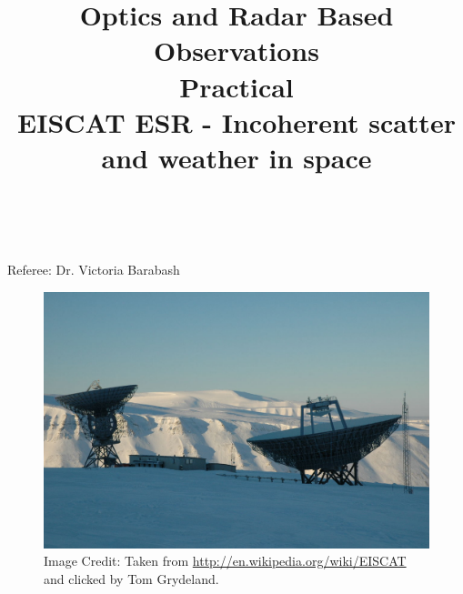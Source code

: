 \documentclass{article}
\title{\textbf {Optics and Radar Based Observations} \\ Practical\\ EISCAT ESR - Incoherent scatter and weather in space} %
\author{\authorivan\\\authoranu}
\begin{document}
\maketitle %

\centerline{Referee: Dr. Victoria Barabash}

\vspace{10mm}

\begin{figure}[h!]
\centering
\includegraphics[width=\textwidth]{Figures/eiscat.jpg}
\caption*{Image Credit: Taken from \url{http://en.wikipedia.org/wiki/EISCAT} and clicked by Tom Grydeland.}
\end{figure}

\setlength\parindent{0pt} %

\renewcommand{\labelenumi}{\alph{enumi}.} %
\clearpage

\tableofcontents

\listoffigures

\clearpage

\end{document}
